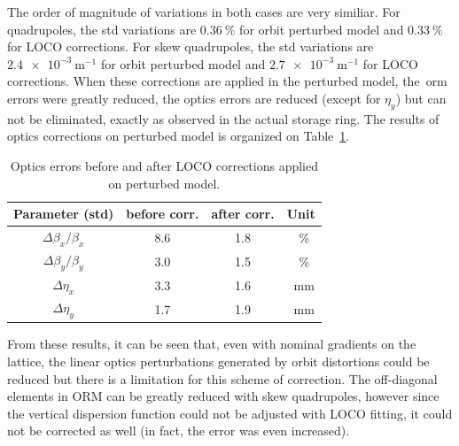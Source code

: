 The order of magnitude of variations in both cases are very similiar. For quadrupoles, the std variations are $\SI{0.36}{\%}$ for orbit perturbed model and $\SI{0.33}{\%}$ for LOCO corrections. For skew quadrupoles, the std variations are $\SI{2.4e-3}{\meter^{-1}}$ for orbit perturbed model and $\SI{2.7e-3}{\meter^{-1}}$ for LOCO corrections. When these corrections are applied in the perturbed model, the~\gls{orm} errors were greatly reduced, the optics errors are reduced (except for $\eta_y$) but can not be eliminated, exactly as observed in the actual storage ring. The results of optics corrections on perturbed model is organized on Table~\ref{tab:params_corr}.
\begin{table}
    \centering
    \caption{Optics errors before and after LOCO corrections applied on perturbed model.}
    \label{tab:params_corr}
    \begin{tabular}{cccc}
        \toprule\toprule
        Parameter (std) & before corr. & after corr. & Unit\\
        \hline
        $\Delta\beta_x/\beta_x$ & \SI{8.6}{} & \SI{1.8}{} & \SI{}{\%}\\
        $\Delta\beta_y/\beta_y$ & \SI{3.0}{} & \SI{1.5}{} & \SI{}{\%}\\
        $\Delta\eta_x$ & \SI{3.3}{} & \SI{1.6}{} & \SI{}{\milli\meter} \\
        $\Delta\eta_y$ & \SI{1.7}{} & \SI{1.9}{} & \SI{}{\milli\meter}\\    
        \bottomrule\bottomrule
    \end{tabular}
\end{table}


From these results, it can be seen that, even with nominal gradients on the lattice, the linear optics perturbations generated by orbit distortions could be reduced but there is a limitation for this scheme of correction. The off-diagonal elements in ORM can be greatly reduced with skew quadrupoles, however since the vertical dispersion function could not be adjusted with LOCO fitting, it could not be corrected as well (in fact, the error was even increased). 


